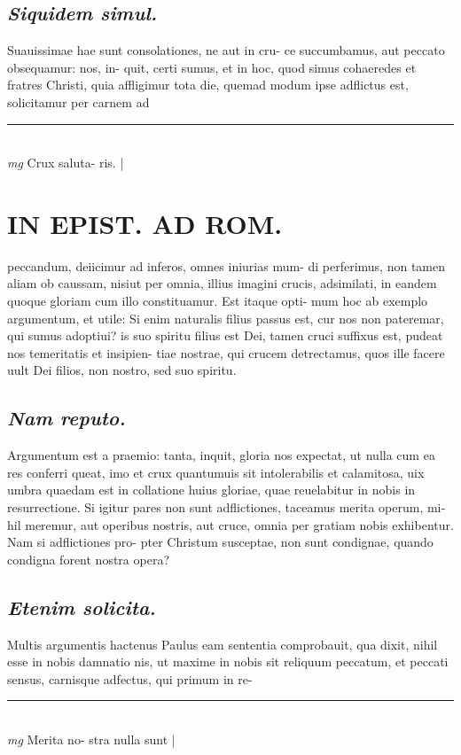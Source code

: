 \documentclass{article}
\begin{document}
\begin{pages}
\subsection*{\textit{Siquidem simul. }}\pstart Suauissimae hae sunt consolationes, ne aut in cru- ce succumbamus, aut peccato obsequamur: nos, in- quit, certi sumus, et in hoc, quod simus cohaeredes et fratres Christi, quia affligimur tota die, quemad modum ipse adflictus est, solicitamur per carnem ad  \pend
\vspace{0.5cm}\noindent
\vspace{0.2cm}\rule{1cm}{0.2pt}\\ 
\hspace{0.2cm}\textit{mg}
\footnotesize Crux saluta- ris. 
\normalsize| 
\section*{IN EPIST. AD ROM.  }
\marginpar{[ p.93 ]}\pstart peccandum, deiicimur ad inferos, omnes iniurias mum- di perferimus, non tamen aliam ob caussam, nisiut per omnia, illius imagini crucis, adsimilati, in eandem quoque gloriam cum illo constituamur. Est itaque opti- mum hoc ab exemplo argumentum, et utile: Si enim naturalis filius passus est, cur nos non pateremar, qui sumus adoptiui? is suo spiritu filius est Dei, tamen cruci suffixus est, pudeat nos temeritatis et insipien- tiae nostrae, qui crucem detrectamus, quos ille facere uult Dei filios, non nostro, sed suo spiritu.   \pend
{}
{}
\subsection*{\textit{Nam reputo. }}\pstart Argumentum est a praemio: tanta, inquit, gloria nos expectat, ut nulla cum ea res conferri queat, imo et crux quantumuis sit intolerabilis et calamitosa, uix umbra quaedam est in collatione huius gloriae, quae reuelabitur in nobis in resurrectione. Si igitur pares non sunt adflictiones, taceamus merita operum, mi- hil meremur, aut operibus nostris, aut cruce, omnia per gratiam nobis exhibentur. Nam si adflictiones pro- pter Christum susceptae, non sunt condignae, quando condigna forent nostra opera?  \pend
{}
{}
\subsection*{\textit{Etenim solicita. }}\pstart Multis argumentis hactenus Paulus eam sententia comprobauit, qua dixit, nihil esse in nobis damnatio nis, ut maxime in nobis sit reliquum peccatum, et peccati sensus, carnisque adfectus, qui primum in re-  \pend
\vspace{0.5cm}\noindent
\vspace{0.2cm}\rule{1cm}{0.2pt}\\ 
\hspace{0.2cm}\textit{mg}
\footnotesize Merita no- stra nulla sunt 
\normalsize| 

\end{pages}
\end{document}
